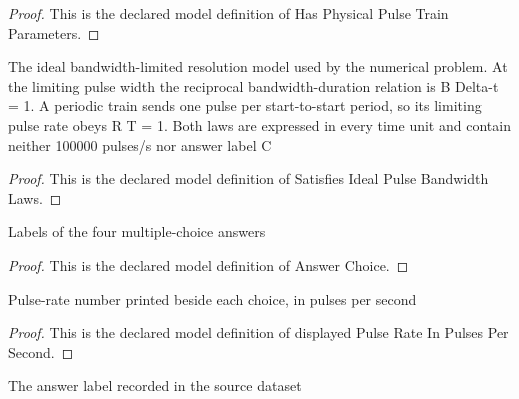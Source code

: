 \begin{proof}
  This is the declared model definition of Has Physical Pulse Train Parameters.
\end{proof}
\begin{definition}
  \label{def:physics:phyx-mini-0649:phyxminiproblems-problemphyxmini0649-satisfiesidealpulsebandwidthlaws}
  The ideal bandwidth-limited resolution model used by the numerical problem. At the limiting pulse width the reciprocal bandwidth-duration relation is B Delta-t = 1. A periodic train sends one pulse per start-to-start period, so its limiting pulse rate obeys R T = 1. Both laws are expressed in every time unit and contain neither 100000 pulses/s nor answer label C
\end{definition}
\begin{proof}
  This is the declared model definition of Satisfies Ideal Pulse Bandwidth Laws.
\end{proof}
\begin{definition}
  \label{def:physics:phyx-mini-0649:phyxminiproblems-problemphyxmini0649-answerchoice}
  Labels of the four multiple-choice answers
\end{definition}
\begin{proof}
  This is the declared model definition of Answer Choice.
\end{proof}
\begin{definition}
  \label{def:physics:phyx-mini-0649:phyxminiproblems-problemphyxmini0649-displayedpulserateinpulsespersecond}
  Pulse-rate number printed beside each choice, in pulses per second
\end{definition}
\begin{proof}
  This is the declared model definition of displayed Pulse Rate In Pulses Per Second.
\end{proof}
\begin{definition}
  \label{def:physics:phyx-mini-0649:phyxminiproblems-problemphyxmini0649-recordeddatasetanswer}
  The answer label recorded in the source dataset
\end{definition}
